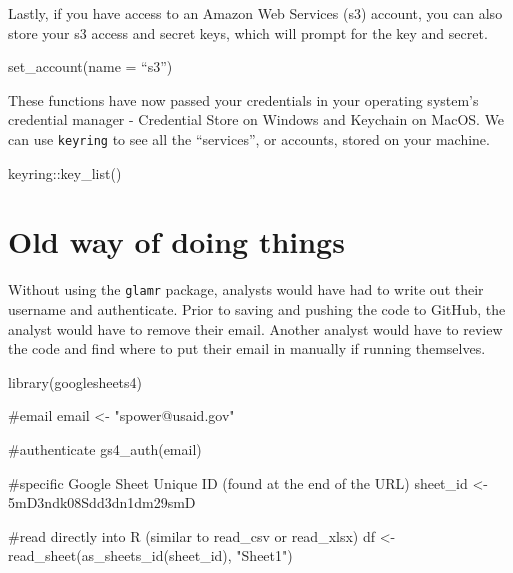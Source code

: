 \documentclass[
  letterpaper,
  DIV=11,
  numbers=noendperiod]{scrreprt}
\newenvironment{Shaded}{\begin{snugshade}}{\end{snugshade}}
\newcommand{\AttributeTok}[1]{\textcolor[rgb]{0.40,0.45,0.13}{#1}}
\newcommand{\CommentTok}[1]{\textcolor[rgb]{0.37,0.37,0.37}{#1}}
\newcommand{\FunctionTok}[1]{\textcolor[rgb]{0.28,0.35,0.67}{#1}}
\newcommand{\NormalTok}[1]{\textcolor[rgb]{0.00,0.23,0.31}{#1}}
\newcommand{\OtherTok}[1]{\textcolor[rgb]{0.00,0.23,0.31}{#1}}
\newcommand{\SpecialCharTok}[1]{\textcolor[rgb]{0.37,0.37,0.37}{#1}}
\newcommand{\StringTok}[1]{\textcolor[rgb]{0.13,0.47,0.30}{#1}}
\begin{document}
Lastly, if you have access to an Amazon Web Services (s3) account, you
can also store your s3 access and secret keys, which will prompt for the
key and secret.

\begin{Shaded}
\begin{Highlighting}[]
\FunctionTok{set\_account}\NormalTok{(}\AttributeTok{name =}\NormalTok{ “s3”)}
\end{Highlighting}
\end{Shaded}

These functions have now passed your credentials in your operating
system's credential manager - Credential Store on Windows and Keychain
on MacOS. We can use \texttt{keyring} to see all the ``services'', or
accounts, stored on your machine.

\begin{Shaded}
\begin{Highlighting}[]
\NormalTok{keyring}\SpecialCharTok{::}\FunctionTok{key\_list}\NormalTok{()}
\end{Highlighting}
\end{Shaded}

\hypertarget{old-way-of-doing-things}{%
\section{Old way of doing things}\label{old-way-of-doing-things}}

Without using the \texttt{glamr} package, analysts would have had to
write out their username and authenticate. Prior to saving and pushing
the code to GitHub, the analyst would have to remove their email.
Another analyst would have to review the code and find where to put
their email in manually if running themselves.

\begin{Shaded}
\begin{Highlighting}[]
\FunctionTok{library}\NormalTok{(googlesheets4)}

\CommentTok{\#email}
\NormalTok{  email }\OtherTok{\textless{}{-}} \StringTok{"spower@usaid.gov"} 

\CommentTok{\#authenticate}
  \FunctionTok{gs4\_auth}\NormalTok{(email)}

\CommentTok{\#specific Google Sheet Unique ID (found at the end of the URL)}
\NormalTok{  sheet\_id }\OtherTok{\textless{}{-}} \StringTok{\textquotesingle{}5mD3ndk08Sdd3dn1dm29smD\textquotesingle{}}
  
\CommentTok{\#read directly into R (similar to read\_csv or read\_xlsx)}
\NormalTok{  df }\OtherTok{\textless{}{-}} \FunctionTok{read\_sheet}\NormalTok{(}\FunctionTok{as\_sheets\_id}\NormalTok{(sheet\_id), }\StringTok{"Sheet1"}\NormalTok{)  }
\end{Highlighting}
\end{Shaded}
\end{document}
